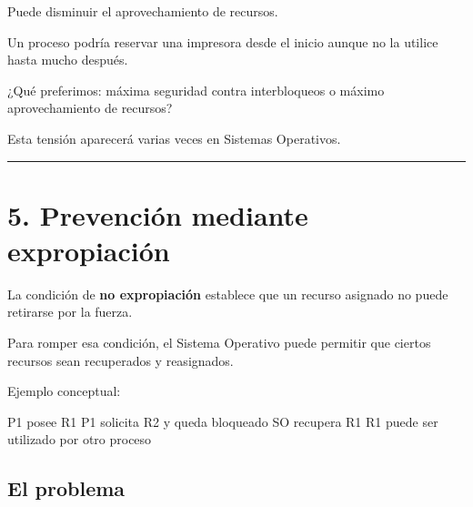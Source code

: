 \documentclass[
  spanish,
  letterpaper,
]{scrbook}
\newenvironment{Shaded}{\begin{snugshade}}{\end{snugshade}}
\newcommand{\NormalTok}[1]{\textcolor[rgb]{0.00,0.23,0.31}{#1}}
\begin{document}
Puede disminuir el aprovechamiento de recursos.

Un proceso podría reservar una impresora desde el inicio aunque no la
utilice hasta mucho después.

\begin{tcolorbox}[enhanced jigsaw, arc=.35mm, bottomrule=.15mm, bottomtitle=1mm, breakable, colback=white, colbacktitle=quarto-callout-note-color!10!white, colframe=quarto-callout-note-color-frame, coltitle=black, left=2mm, leftrule=.75mm, opacityback=0, opacitybacktitle=0.6, rightrule=.15mm, title=\textcolor{quarto-callout-note-color}{\faInfo}\hspace{0.5em}{Pregunta}, titlerule=0mm, toprule=.15mm, toptitle=1mm]

¿Qué preferimos: máxima seguridad contra interbloqueos o máximo
aprovechamiento de recursos?

Esta tensión aparecerá varias veces en Sistemas Operativos.

\end{tcolorbox}

\begin{center}\rule{0.5\linewidth}{0.5pt}\end{center}


\chapter{5. Prevención mediante
expropiación}\label{prevenciuxf3n-mediante-expropiaciuxf3n}

La condición de \textbf{no expropiación} establece que un recurso
asignado no puede retirarse por la fuerza.

Para romper esa condición, el Sistema Operativo puede permitir que
ciertos recursos sean recuperados y reasignados.

Ejemplo conceptual:

\begin{Shaded}
\begin{Highlighting}[]
\NormalTok{P1 posee R1}
\NormalTok{P1 solicita R2 y queda bloqueado}
\NormalTok{SO recupera R1}
\NormalTok{R1 puede ser utilizado por otro proceso}
\end{Highlighting}
\end{Shaded}

\section{El problema}\label{el-problema-1}
\end{document}
